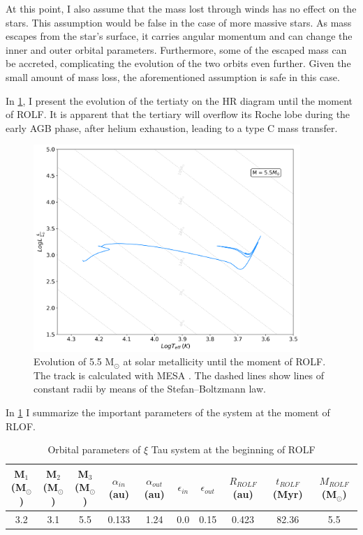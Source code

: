 At this point, I also assume that the mass lost through winds has no effect on the stars. This assumption would be false in the case of more massive stars. As mass escapes from the star's surface, it carries angular momentum and can change the inner and outer orbital parameters. Furthermore, some of the escaped mass can be accreted, complicating the evolution of the two orbits even further. Given the small amount of mass loss, the aforementioned assumption is safe in this case.

In \cref{fig:HR_ROLF}, I present the evolution of the tertiaty on the HR diagram until the moment of ROLF. It is apparent that the tertiary will overflow its Roche lobe during the early AGB phase, after helium exhaustion, leading to a type C mass transfer.

\begin{figure}[H]
    \centering
    \includegraphics[width=0.9\textwidth]{Thesis/graphs/HR_1-1ROLF.pdf}
    \caption{Evolution of 5.5 M$_{\odot}$ at solar metallicity until the moment of ROLF. The track is calculated with MESA \citep{paxton2010modules,paxton2013modules,paxton2015modules,paxton2019modules}. The dashed lines show lines of constant radii by means of the Stefan–Boltzmann law.}
    \label{fig:HR_ROLF}
\end{figure}

In \cref{tab:system_orbit_param_ROLF} I summarize the important parameters of the system at the moment of RLOF. 

\begin{table}[H]
    \begin{adjustbox}{width=1\textwidth}
    \small
    \centering
    \begin{tabular}{| c c c c c c c c c c|}
       M$_1$ (M$_{\odot}$) & 
       M$_2$ (M$_{\odot}$) &
       M$_3$ (M$_{\odot}$) & $\alpha_{in}$ (au) &
       $\alpha_{out}$ (au) &
       $\epsilon_{in}$ &
       $\epsilon_{out}$ &
       $R_{ROLF}$ (au) &
       $t_{ROLF}$ (Myr) &
       $M_{ROLF}$  (M$_{\odot}$) \\
       \hline
       3.2 & 3.1 & 5.5 & 0.133 & 1.24 & 0.0 & 0.15 & 0.423 & 82.36 & 5.5
    \end{tabular}
    \end{adjustbox}
    \caption{ Orbital parameters of $\xi$ Tau system at the beginning of ROLF}
    \label{tab:system_orbit_param_ROLF}
\end{table}

